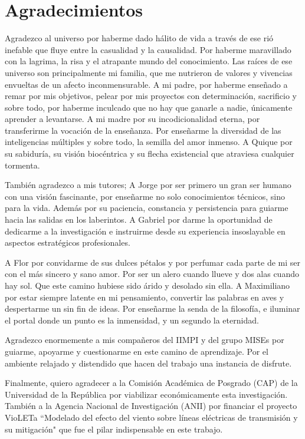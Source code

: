 \chapter*{Agradecimientos}

Agradezco al universo por haberme dado hálito de vida a través de ese rió inefable que fluye entre la casualidad y la causalidad. Por haberme maravillado con la lagrima, la risa y el atrapante mundo del conocimiento. Las raíces de ese universo son principalmente mi familia, que me nutrieron de valores y vivencias envueltas de un afecto inconmensurable. A mi padre, por haberme enseñado a remar por mis objetivos, pelear por mis proyectos con determinación, sacrificio y sobre todo, por haberme inculcado que no hay que ganarle a nadie, únicamente aprender a levantarse. A mi madre por su incodicionalidad eterna, por transferirme la vocación de la enseñanza. Por enseñarme la diversidad de las inteligencias múltiples y sobre todo, la semilla del amor inmenso. A Quique por su sabiduría, su visión biocéntrica y su flecha existencial que atraviesa cualquier tormenta. 

También agradezco a mis tutores; A Jorge por ser primero un gran ser humano con una visión fascinante, por enseñarme no solo conocimientos técnicos, sino para la vida. Además por su paciencia, constancia y persistencia para guiarme hacia las salidas en los laberintos. A Gabriel por darme la oportunidad de dedicarme a la investigación e instruirme desde su experiencia insoslayable en aspectos estratégicos profesionales.   

A Flor por convidarme de sus dulces pétalos y por perfumar cada parte de mi ser con el más sincero y sano amor. Por ser un alero cuando llueve y dos alas cuando hay sol. Que este camino hubiese sido árido y desolado sin ella. A Maximiliano por estar siempre latente en mi pensamiento, convertir las palabras en aves y despertarme un sin fin de ideas. Por enseñarme la senda de la filosofía, e iluminar el portal donde un punto es la inmensidad, y un segundo la eternidad.

Agradezco enormemente a mis compañeros del IIMPI y del grupo MISEs por guiarme, apoyarme y cuestionarme en este camino de aprendizaje. Por el ambiente relajado y distendido que hacen del trabajo una instancia de disfrute.

Finalmente, quiero agradecer a la Comisión Académica de Posgrado (CAP) de la Universidad de la República por viabilizar económicamente esta investigación. También a la Agencia Nacional de Investigación (ANII) por financiar el proyecto VioLETa ``Modelado del efecto del viento sobre líneas eléctricas de  transmisión y su mitigación" que fue el pilar indispensable en este trabajo.